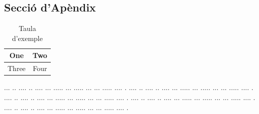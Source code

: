 \documentclass[10pt,a4paper,twocolumn,twoside]{article}
\begin{document}
    \subsection{Secció d'Apèndix}
    \begin{table}[h]
    \caption{Taula d'exemple}
    \label{tab:senzilla}
    \begin{center}
    \begin{tabular}{|c|c|}
    \hline
    One & Two\\
    \hline
    Three & Four\\
    \hline
    \end{tabular}
    \end{center}
    \end{table}
    
    ... ..  .... .. .... ... ..... ... ..... ... ... ..... .... .
    .... ..  .... .. .... ... ..... ... ..... ... ... ..... .... .
    .... ..  .... .. .... ... ..... ... ..... ... ... ..... .... .
    .... ..  .... .. .... ... ..... ... ..... ... ... ..... .... .
    .... ..  .... .. .... ... ..... ... ..... ... ... ..... .... .
\end{document}
